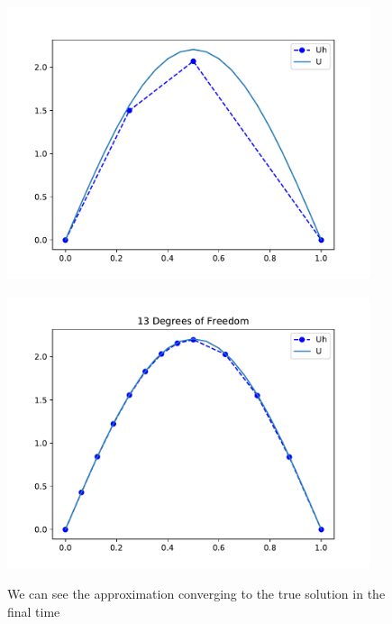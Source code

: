 \documentclass{uonmathreport}
\theoremstyle{definition}
\theoremstyle{problem}
\theoremstyle{theorem}
\begin{document}
\begin{figure}[h!]
\caption{We can see the approximation converging to the true solution in the final time}
\begin{minipage}{0.49\hsize}
   \includegraphics[width=0.95\textwidth]{OriginalPDEcoarse.pdf}
  \end{minipage}
  \hfill
    \begin{minipage}{0.49\hsize}
    \includegraphics[width=0.95\textwidth]{OriginalPDEfine.pdf}
  \label{fig:heat1_final}
\end{minipage}
    \end{figure}
    
    
    
\end{document}
